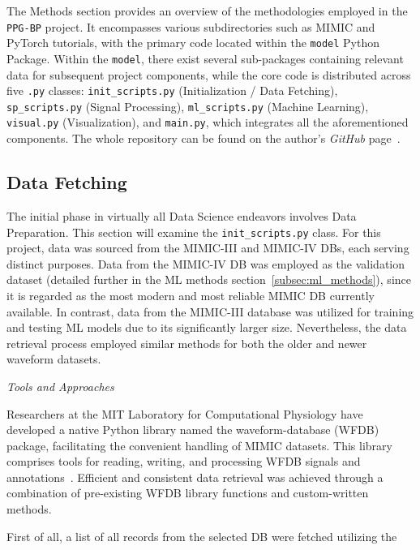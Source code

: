 The Methods section provides an overview of the methodologies employed in the \texttt{PPG-BP} project.
It encompasses various subdirectories such as MIMIC and PyTorch tutorials, with the primary code located within the \texttt{model} Python Package.
Within the \texttt{model}, there exist several sub-packages containing relevant data for subsequent project components,
while the core code is distributed across five \texttt{.py} classes: \texttt{init\_scripts.py} (Initialization / Data Fetching), \texttt{sp\_scripts.py} (Signal Processing),
\texttt{ml\_scripts.py} (Machine Learning), \texttt{visual.py} (Visualization), and \texttt{main.py}, which integrates all the aforementioned components.
The whole repository can be found on the author's \textit{GitHub} page~\cite{jasinskasHtjasPPGBPProject2024}.

\subsection{Data Fetching}
\label{subsec:data-fetching}

The initial phase in virtually all Data Science endeavors involves Data Preparation.
This section will examine the \texttt{init\_scripts.py} class.
For this project, data was sourced from the MIMIC-III and MIMIC-IV DBs, each serving distinct purposes.
Data from the MIMIC-IV DB was employed as the validation dataset (detailed further in the ML methods section~\ref{subsec:ml_methods}), since it is regarded as the most modern and most reliable MIMIC DB currently available.
In contrast, data from the MIMIC-III database was utilized for training and testing ML models due to its significantly larger size.
Nevertheless, the data retrieval process employed similar methods for both the older and newer waveform datasets.

\vspace{0.2cm}
\textit{Tools and Approaches}
\vspace{0.2cm}

Researchers at the MIT Laboratory for Computational Physiology have developed a native Python library named the waveform-database (WFDB) package, facilitating the convenient handling of MIMIC datasets.
This library comprises tools for reading, writing, and processing WFDB signals and annotations~\cite{MITLCPWfdbpython2024}.
Efficient and consistent data retrieval was achieved through a combination of pre-existing WFDB library functions and custom-written methods.

First of all, a list of all records from the selected DB were fetched utilizing the

